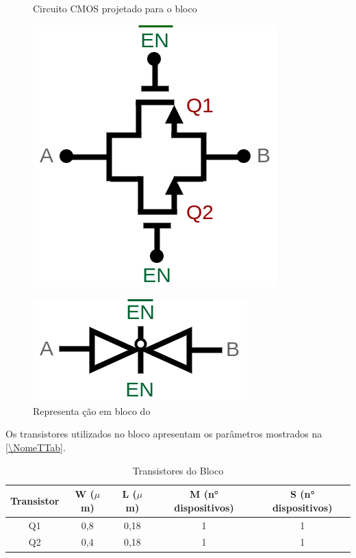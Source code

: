 \begin{figure}[htb]
 \label{\NomePFig}
 \centering
  \begin{minipage}{0.4\textwidth}
    \centering
    \caption{Circuito CMOS projetado para o bloco \emph{\NomeBloco}} \label{\NomePFig}
    \includegraphics[scale=0.3]{Circuitos/TG.png}
  \end{minipage}
  \hfill
  \begin{minipage}{0.4\textwidth}
    \centering
    \caption{Representa ção em bloco do \emph{\NomeBloco}} \label{\NomeSFig}
    \includegraphics[scale=0.3]{Circuitos/TG_Simbolo.png}
  \end{minipage}
\end{figure}

Os transistores utilizados no bloco \emph{\NomeBloco{}} apresentam os par\^ametros mostrados na \autoref{\NomeTTab}.

\begin{table}[htbp]
\caption{Transistores do Bloco \emph{\NomeBloco}}
\label{\NomeTTab}
\centering
\begin{tabular}{ccccc}
\toprule
Transistor & W ($\mu$m)  & L ($\mu$m)           & M (n° dispositivos) & S (n° dispositivos)\\
\midrule \midrule
Q1 & 0,8 & 0,18 & 1 & 1\\
\midrule
Q2 & 0,4 & 0,18 & 1 & 1\\
\bottomrule
\end{tabular}
\end{table}